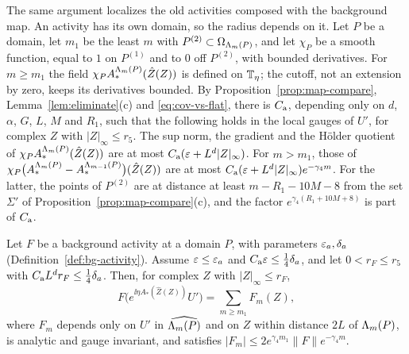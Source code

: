 The same argument localizes the old activities composed with the background map. An activity has its own domain, so the radius depends on it. Let $P$ be a domain, let $m_1$ be the least $m$ with $P^{(2)}\subset\Omega_{\Lambda_m(P)}$, and let $\chi_P$ be a smooth function, equal to $1$ on $P^{(1)}$ and to $0$ off $P^{(2)}$, with bounded derivatives. For $m\ge m_1$ the field $\chi_PA^{\Lambda_m(P)}_*(\hat Z(Z))$ is defined on $\mathbb T_\eta$; the cutoff, not an extension by zero, keeps its derivatives bounded. By Proposition~\ref{prop:map-compare}, Lemma~\ref{lem:eliminate}(c) and \eqref{eq:cov-vs-flat}, there is $C_{\rm a}$, depending only on $d$, $\alpha$, $G$, $L$, $M$ and $R_1$, such that the following holds in the local gauges of $U'$, for complex $Z$ with $|Z|_\infty\le r_5$. The sup norm, the gradient and the H\"older quotient of $\chi_PA^{\Lambda_m(P)}_*(\hat Z(Z))$ are at most $C_{\rm a}(\varepsilon+L^d|Z|_\infty)$. For $m>m_1$, those of $\chi_P\big(A^{\Lambda_m(P)}_*-A^{\Lambda_{m-1}(P)}_*\big)(\hat Z(Z))$ are at most $C_{\rm a}(\varepsilon+L^d|Z|_\infty)e^{-\gamma_4m}$. For the latter, the points of $P^{(2)}$ are at distance at least $m-R_1-10M-8$ from the set $\Sigma'$ of Proposition~\ref{prop:map-compare}(c), and the factor $e^{\gamma_4(R_1+10M+8)}$ is part of $C_{\rm a}$.

\begin{corollary}\label{cor:composed}
Let $F$ be a background activity at a domain $P$, with parameters $\varepsilon_a,\delta_a$ (Definition~\ref{def:bg-activity}). Assume $\varepsilon\le\varepsilon_a$ and $C_{\rm a}\varepsilon\le\frac14\delta_a$, and let $0<r_F\le r_5$ with $C_{\rm a}L^dr_F\le\frac14\delta_a$. Then, for complex $Z$ with $|Z|_\infty\le r_F$,
\[
F\big(e^{\ii\eta A_*(\hat Z(Z))}U'\big)=\sum_{m\ge m_1}F_m(Z),
\]
where $F_m$ depends only on $U'$ in $\widehat{\Lambda_m(P)}$ and on $Z$ within distance $2L$ of $\Lambda_m(P)$, is analytic and gauge invariant, and satisfies $|F_m|\le2e^{\gamma_4m_1}\|F\|e^{-\gamma_4m}$.
\end{corollary}

